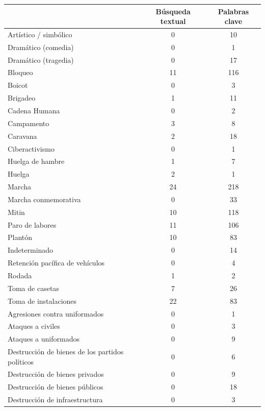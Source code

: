 \documentclass[letterpaper, 11pt]{book}
\theoremstyle{definition}
\theoremstyle{remark}
\begin{document}
\begin{table}[H]
\scriptsize
\centering
{} \label{Muestreo_repertorios}
\begin{tabular}{ | l | c | c | }
\cline{2-3}
\multicolumn{1}{c|}{ } & \textbf{Búsqueda textual} & \textbf{Palabras clave} \\
\hline
Artístico / simbólico & 0 & 10\\
\hline
Dramático (comedia) & 0 & 1\\
\hline
Dramático (tragedia) & 0 & 17\\
\hline
Bloqueo & 11 & 116\\
\hline
Boicot & 0 & 3\\
\hline
Brigadeo & 1 & 11\\
\hline
Cadena Humana & 0 & 2\\
\hline
Campamento & 3 & 8\\
\hline
Caravana & 2 & 18\\
\hline
Ciberactivismo & 0 & 1\\
\hline
Huelga de hambre & 1 & 7\\
\hline
Huelga & 2 & 1\\
\hline
Marcha & 24 & 218\\
\hline
Marcha conmemorativa & 0 & 33\\
\hline
Mitin & 10 & 118\\
\hline
Paro de labores & 11 & 106\\
\hline
Plantón & 10 & 83\\
\hline
Indeterminado & 0 & 14\\
\hline
Retención pacífica de vehículos & 0 & 4\\
\hline
Rodada & 1 & 2\\
\hline
Toma de casetas & 7 & 26\\
\hline
Toma de instalaciones & 22 & 83\\
\hline
Agresiones contra uniformados & 0 & 1\\
\hline
Ataques a civiles & 0 & 3\\
\hline
Ataques a uniformados & 0 & 9\\
\hline
Destrucción de bienes de los partidos políticos & 0 & 6\\
\hline
Destrucción de bienes privados & 0 & 9\\
\hline
Destrucción de bienes públicos & 0 & 18\\
\hline
Destrucción de infraestructura & 0 & 3\\
\hline

\end{tabular}
\end{table}
\end{document}
